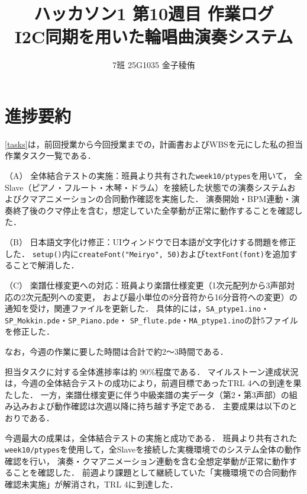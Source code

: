 \documentclass[uplatex,dvipdfmx]{jlreq}
\begin{document}
\title{ハッカソン1 第10週目 作業ログ \\ I2C同期を用いた輪唱曲演奏システム}
\author{7班 25G1035 金子稜侑}
\maketitle

\section{進捗要約}
\label{begin}

\ref{tasks}は，前回授業から今回授業までの，計画書およびWBSを元にした私の担当作業タスク一覧である．

\begin{tcolorbox}[title = 担当作業タスク一覧, arc=3mm, colback=white, breakable]
    \label{tasks}
     （A） 全体結合テストの実施：班員より共有された\texttt{week10/ptypes}を用いて，
     全Slave（ピアノ・フルート・木琴・ドラム）を接続した状態での演奏システムおよびクマアニメーションの合同動作確認を実施した．
     演奏開始・BPM連動・演奏終了後のクマ停止を含む，想定していた全挙動が正常に動作することを確認した．

     （B） 日本語文字化け修正：UIウィンドウで日本語が文字化けする問題を修正した．
     \texttt{setup()}内に\texttt{createFont("Meiryo", 50)}および\texttt{textFont(font)}を追加することで解消した．

     （C） 楽譜仕様変更への対応：班員より楽譜仕様変更（1次元配列から3声部対応の2次元配列への変更，
     および最小単位の8分音符から16分音符への変更）の通知を受け，関連ファイルを更新した．
     具体的には，\texttt{SA\_ptype1.ino}・\texttt{SP\_Mokkin.pde}・\texttt{SP\_Piano.pde}・
     \texttt{SP\_flute.pde}・\texttt{MA\_ptype1.ino}の計5ファイルを修正した．

     なお，今週の作業に要した時間は合計で約2〜3時間である．
\end{tcolorbox}

担当タスクに対する全体進捗率は約 90\%程度である．
マイルストーン達成状況は，今週の全体結合テストの成功により，前週目標であったTRL 4への到達を果たした．
一方，楽譜仕様変更に伴う中級楽譜の実データ（第2・第3声部）の組み込みおよび動作確認は次週以降に持ち越す予定である．
主要成果は以下のとおりである．

今週最大の成果は，全体結合テストの実施と成功である．
班員より共有された\texttt{week10/ptypes}を使用して，全Slaveを接続した実機環境でのシステム全体の動作確認を行い，
演奏・クマアニメーション連動を含む全想定挙動が正常に動作することを確認した．
前週より課題として継続していた「実機環境での合同動作確認未実施」が解消され，TRL 4に到達した．
\end{document}
